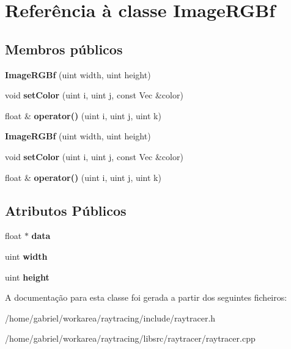 \hypertarget{classImageRGBf}{}\section{Referência à classe Image\+R\+G\+Bf}
\label{classImageRGBf}
\subsection*{Membros públicos}
\begin{DoxyCompactItemize}
\item 
\mbox{\label{classImageRGBf_acee10672e885f5e0f3a9db7bf24059d2}} 
{\bfseries Image\+R\+G\+Bf} (uint width, uint height)
\item 
\mbox{\label{classImageRGBf_a896e20a0b686b16673ca194deca69f41}} 
void {\bfseries set\+Color} (uint i, uint j, const Vec \&color)
\item 
\mbox{\label{classImageRGBf_aeca1409e7489d02a45961a595de3ba61}} 
float \& {\bfseries operator()} (uint i, uint j, uint k)
\item 
\mbox{\label{classImageRGBf_acee10672e885f5e0f3a9db7bf24059d2}} 
{\bfseries Image\+R\+G\+Bf} (uint width, uint height)
\item 
\mbox{\label{classImageRGBf_a896e20a0b686b16673ca194deca69f41}} 
void {\bfseries set\+Color} (uint i, uint j, const Vec \&color)
\item 
\mbox{\label{classImageRGBf_ab50aa22791513e10ed01d2a970dd7d31}} 
float \& {\bfseries operator()} (uint i, uint j, uint k)
\end{DoxyCompactItemize}
\subsection*{Atributos Públicos}
\begin{DoxyCompactItemize}
\item 
\mbox{\label{classImageRGBf_a5ab048f770e190a418a935b772ad809d}} 
float $\ast$ {\bfseries data}
\item 
\mbox{\label{classImageRGBf_a6ec173fcc2dfe9df78bd365418f42db4}} 
uint {\bfseries width}
\item 
\mbox{\label{classImageRGBf_a05f92bf07d095d1d00594282758bfc60}} 
uint {\bfseries height}
\end{DoxyCompactItemize}


A documentação para esta classe foi gerada a partir dos seguintes ficheiros\+:\begin{DoxyCompactItemize}
\item 
/home/gabriel/workarea/raytracing/include/raytracer.\+h\item 
/home/gabriel/workarea/raytracing/libsrc/raytracer/raytracer.\+cpp\end{DoxyCompactItemize}
